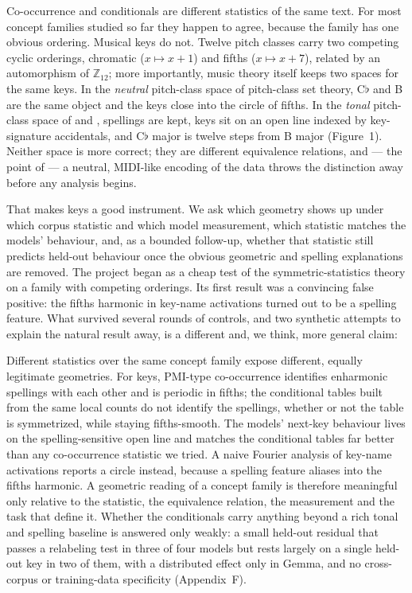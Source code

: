 \documentclass[11pt]{article}
\newcommand{\fl}{$\flat$}
\begin{document}
Co-occurrence and conditionals are different statistics of the same text. For most concept families studied so far they happen to agree, because the family has one obvious ordering. Musical keys do not. Twelve pitch classes carry two competing cyclic orderings, chromatic ($x\mapsto x+1$) and fifths ($x\mapsto x+7$), related by an automorphism of $\mathbb{Z}_{12}$; more importantly, music theory itself keeps two spaces for the same keys. In the \emph{neutral} pitch-class space of pitch-class set theory, C\fl{} and B are the same object and the keys close into the circle of fifths. In the \emph{tonal} pitch-class space of \citet{temperley2000line} and \citet{moss2023line}, spellings are kept, keys sit on an open line indexed by key-signature accidentals, and C\fl{} major is twelve steps from B major (Figure~1). Neither space is more correct; they are different equivalence relations, and --- the point of \citet{moss2023line} --- a neutral, MIDI-like encoding of the data throws the distinction away before any analysis begins.

That makes keys a good instrument. We ask which geometry shows up under which corpus statistic and which model measurement, which statistic matches the models' behaviour, and, as a bounded follow-up, whether that statistic still predicts held-out behaviour once the obvious geometric and spelling explanations are removed. The project began as a cheap test of the symmetric-statistics theory on a family with competing orderings. Its first result was a convincing false positive: the fifths harmonic in key-name activations turned out to be a spelling feature. What survived several rounds of controls, and two synthetic attempts to explain the natural result away, is a different and, we think, more general claim:

\begin{scopebox}
Different statistics over the same concept family expose different, equally legitimate geometries. For keys, PMI-type co-occurrence identifies enharmonic spellings with each other and is periodic in fifths; the conditional tables built from the same local counts do not identify the spellings, whether or not the table is symmetrized, while staying fifths-smooth. The models' next-key behaviour lives on the spelling-sensitive open line and matches the conditional tables far better than any co-occurrence statistic we tried. A naive Fourier analysis of key-name activations reports a circle instead, because a spelling feature aliases into the fifths harmonic. A geometric reading of a concept family is therefore meaningful only relative to the statistic, the equivalence relation, the measurement and the task that define it. Whether the conditionals carry anything beyond a rich tonal and spelling baseline is answered only weakly: a small held-out residual that passes a relabeling test in three of four models but rests largely on a single held-out key in two of them, with a distributed effect only in Gemma, and no cross-corpus or training-data specificity (Appendix~F).
\end{scopebox}
\end{document}
